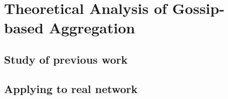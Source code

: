 \documentclass[11pt,a4paper]{article}
\begin{document}
\newpage

\section{Theoretical Analysis of Gossip-based Aggregation}
\subsection{Study of previous work}

\subsection{Applying to real network}
\end{document}
